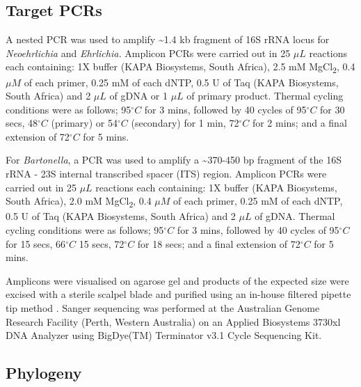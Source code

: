 \documentclass[a4paper, nobind]{templates/ociamthesis}
\begin{document}
\hypertarget{target-pcrs}{%
\subsection{Target PCRs}\label{target-pcrs}}

A nested PCR was used to amplify \textasciitilde1.4 kb fragment of 16S rRNA locus for \emph{Neoehrlichia} and \emph{Ehrlichia.}
Amplicon PCRs were carried out in 25 \(\mu L\) reactions each containing: 1X buffer (KAPA Biosystems, South Africa), 2.5 mM MgCl\textsubscript{2}, 0.4 \(\mu M\) of each primer, 0.25 mM of each dNTP, 0.5 U of Taq (KAPA Biosystems, South Africa) and 2 \(\mu L\) of gDNA or 1 \(\mu L\) of primary product.
Thermal cycling conditions were as follows; 95\(^\circ C\) for 3 mins, followed by 40 cycles of 95\(^\circ C\) for 30 secs, 48\(^\circ C\) (primary) or 54\(^\circ C\) (secondary) for 1 min, 72\(^\circ C\) for 2 mins; and a final extension of 72\(^\circ C\) for 5 mins.

For \emph{Bartonella}, a PCR was used to amplify a \textasciitilde370-450 bp fragment of the 16S rRNA - 23S internal transcribed spacer (ITS) region.
Amplicon PCRs were carried out in 25 \(\mu L\) reactions each containing: 1X buffer (KAPA Biosystems, South Africa), 2.0 mM MgCl\textsubscript{2}, 0.4 \(\mu M\) of each primer, 0.25 mM of each dNTP, 0.5 U of Taq (KAPA Biosystems, South Africa) and 2 \(\mu L\) of gDNA.
Thermal cycling conditions were as follows; 95\(^\circ C\) for 3 mins, followed by 40 cycles of 95\(^\circ C\) for 15 secs, 66\(^\circ C\) 15 secs, 72\(^\circ C\) for 18 secs; and a final extension of 72\(^\circ C\) for 5 mins.

Amplicons were visualised on agarose gel and products of the expected size were excised with a sterile scalpel blade and purified using an in-house filtered pipette tip method \autocite{yangSpecificQuantitativeDetection2013}.
Sanger sequencing was performed at the Australian Genome Research Facility (Perth, Western Australia) on an Applied Biosystems 3730xl DNA Analyzer using BigDye(TM) Terminator v3.1 Cycle Sequencing Kit.

\hypertarget{phylogeny}{%
\subsection{Phylogeny}\label{phylogeny}}
\end{document}
